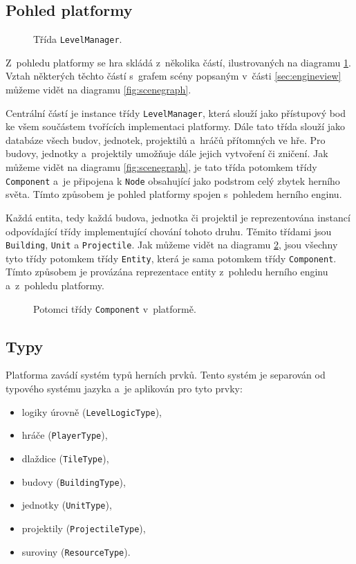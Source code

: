 \subsection{Pohled platformy}
\label{sec:platformimpl}

\begin{figure}[h]
	\centering
	\fontsize{8pt}{11pt}\selectfont
	\def\svgwidth{\textwidth}
	
	\caption{Třída \texttt{LevelManager}.}
	\label{fig:platform}
\end{figure}

Z~pohledu platformy se hra skládá z~několika částí, ilustrovaných na diagramu \ref{fig:platform}. Vztah některých těchto částí s~grafem scény popsaným v~části \ref{sec:engineview} můžeme vidět na diagramu \ref{fig:scenegraph}.

Centrální částí je instance třídy \texttt{LevelManager}, která slouží jako přístupový bod ke všem součástem tvořících implementaci platformy. Dále tato třída slouží jako databáze všech budov, jednotek, projektilů a~hráčů přítomných ve hře. Pro budovy, jednotky a~projektily umožňuje dále jejich vytvoření či zničení. Jak můžeme vidět na diagramu \ref{fig:scenegraph}, je tato třída potomkem třídy \texttt{Component} a~je připojena k \texttt{Node} obsahující jako podstrom celý zbytek herního světa. Tímto způsobem je pohled platformy spojen s~pohledem herního enginu.

Každá entita, tedy každá budova, jednotka či projektil je reprezentována instancí odpovídající třídy implementující chování tohoto druhu. Těmito třídami jsou \texttt{Building}, \texttt{Unit} a \texttt{Projectile}. Jak můžeme vidět na diagramu \ref{fig:componenthierarchy}, jsou všechny tyto třídy potomkem třídy \texttt{Entity}, která je sama potomkem třídy \texttt{Component}. Tímto způsobem je provázána reprezentace entity z~pohledu herního enginu a~z~pohledu platformy. 


\begin{figure}[h]
	\centering
	\fontsize{9pt}{11pt}\selectfont
	\def\svgwidth{0.7\textwidth}
	
	\caption{Potomci třídy \texttt{Component} v~platformě.}
	\label{fig:componenthierarchy}
\end{figure}

\subsection{Typy}
\label{sec:types}
Platforma zavádí systém typů herních prvků. Tento systém je separován od typového systému jazyka a~je aplikován pro tyto prvky:
\begin{itemize}
	\item logiky úrovně (\texttt{LevelLogicType}),
	\item hráče (\texttt{PlayerType}),
	\item dlaždice (\texttt{TileType}),
	\item budovy (\texttt{BuildingType}),
	\item jednotky (\texttt{UnitType}),
	\item projektily (\texttt{ProjectileType}),
	\item suroviny (\texttt{ResourceType}).
\end{itemize}

